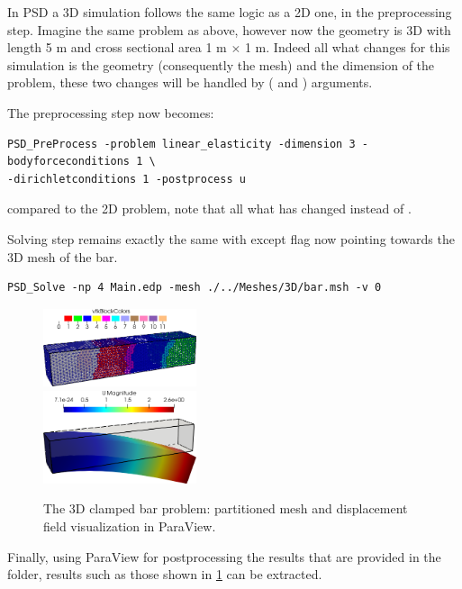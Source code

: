 In PSD a 3D simulation follows the same logic as a 2D one, in the
preprocessing step. Imagine the same problem as above, however now the
geometry is 3D with length 5 m and cross sectional area 1 m \(\times\) 1
m. Indeed all what changes for this simulation is the geometry
(consequently the mesh) and the dimension of the problem, these two
changes will be handled by ( and ) arguments.

The preprocessing step now becomes:

\begin{lstlisting}[style=BashInputStyle]
PSD_PreProcess -problem linear_elasticity -dimension 3 -bodyforceconditions 1 \
-dirichletconditions 1 -postprocess u
\end{lstlisting}

compared to the 2D problem, note that all what has changed
 instead of .

Solving step remains exactly the same with except  flag now
pointing towards the 3D mesh of the bar.

\begin{lstlisting}[style=BashInputStyle]
PSD_Solve -np 4 Main.edp -mesh ./../Meshes/3D/bar.msh -v 0
\end{lstlisting}

\begin{figure}[h!]
\centering
\includegraphics[width=0.4\textwidth]{./Images/le-3d-bar-clamped-ends.png}\\
\includegraphics[width=0.4\textwidth]{./Images/le-3d-bar-clamped-pulled-partioned.png}
\caption{The 3D clamped bar problem: partitioned mesh and displacement field visualization in ParaView. \label{3dbar-le-full}}
\end{figure}

Finally, using ParaView for postprocessing the results that are provided
in the \psd{VTUs...} folder, results such as those shown in
\cref{3dbar-le-full} can be extracted.
